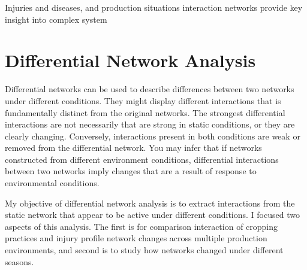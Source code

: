  

Injuries and diseases, and production situations interaction networks provide key insight into complex system 

\section*{Differential Network Analysis}  %

Differential networks can be used to describe differences between two networks under different conditions. They might display different interactions that is fundamentally distinct from the original networks. The strongest differential interactions are not necessarily that are strong in static conditions, or they are clearly changing. Conversely, interactions present in both conditions are weak or removed from the differential network. You may infer that if networks constructed from different environment conditions, differential interactions between two networks imply changes that are a result of response to environmental conditions. 

My objective of differential network analysis is to extract interactions from the static network that appear to be active under different conditions. I focused two aspects of this analysis. The first is for comparison interaction of cropping practices and injury profile network changes across multiple production environments, and second is to study how networks changed under different seasons. 

